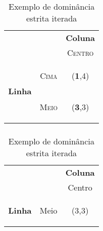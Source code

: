 \begin{frame}
\frametitle{\subsubsecname}
\begin{table}[ht]
\centering
\begin{tabular}{|c|c|c|}
\cline{3-3}
\multicolumn{1}{c}{} &  & \multicolumn{1}{c|}{\textbf{Coluna}}\tabularnewline
\cline{3-3}
\multicolumn{1}{c}{} &  &  \textsc{Centro}\tabularnewline
\hline
\multirow{2}{*}{\begin{turn}{90}
\textbf{Linha}
\end{turn}} & \begin{turn}{90}
\textsc{Cima}
\end{turn} & {\Large(\textbf{1},4)} \tabularnewline
\cline{2-3}
 & \begin{turn}{90}
\textsc{Meio}
\end{turn} & {\Large(\textbf{3},3)} \tabularnewline
\hline
\end{tabular}
\caption{Exemplo de dominância estrita iterada}
\label{tab:dominancia-estrita-iterada}
\end{table}
\end{frame}

\begin{frame}
\frametitle{\subsubsecname}
\begin{table}[ht]
\centering

\begin{tabular}{cc|c|}
\cline{3-3}
 &  & \textbf{Coluna}\tabularnewline
\cline{3-3}
 &  & Centro\tabularnewline
\hline
\multicolumn{1}{|c|}{\begin{turn}{90}
\textbf{Linha}
\end{turn}} & \begin{turn}{90}
Meio
\end{turn} & {\Large(3,3)}\tabularnewline
\hline
\end{tabular}

\caption{Exemplo de dominância estrita iterada}
\label{tab:dominancia-estrita-iterada}
\end{table}
\end{frame}
